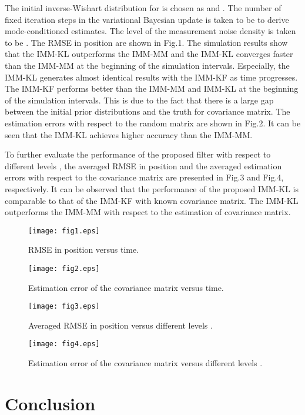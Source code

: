 \documentclass[12pt,draftcls,onecolumn]{IEEEtran}
\begin{document}
The initial inverse-Wishart distribution for  is chosen as
 and  .
The number of fixed iteration steps in the variational Bayesian
update is taken to be  to derive mode-conditioned estimates.
The level of the measurement noise density is taken to be .
The RMSE in position are shown in Fig.1. The simulation results show
that the IMM-KL outperforms the IMM-MM and the IMM-KL converges
faster than the IMM-MM at the beginning of the simulation intervals.
Especially, the IMM-KL generates almost identical results with the
IMM-KF as time progresses. The IMM-KF performs better than the
IMM-MM and IMM-KL at the beginning of the simulation intervals. This
is due to the fact that there is a large gap between the initial
prior distributions and the truth for covariance matrix. The
estimation errors with respect to the random matrix  are shown
in Fig.2. It can be seen that the IMM-KL achieves higher accuracy
than the IMM-MM.


To further evaluate the performance of the proposed filter with
respect to different levels , the averaged RMSE in position and
the averaged estimation errors with respect to the covariance matrix
are presented in Fig.3 and Fig.4, respectively. It can be observed
that the performance of the proposed IMM-KL is comparable to that of
the IMM-KF with known covariance matrix. The IMM-KL outperforms the
IMM-MM with respect to the estimation of covariance matrix.


\begin{figure}
\centering
\texttt{[image: fig1.eps]}
\caption{RMSE in position versus time.} \label{fig1}
\end{figure}
\begin{figure}
\centering
\texttt{[image: fig2.eps]}
\caption{Estimation error of the covariance matrix versus time.}
\label{fig2}
\end{figure}
\begin{figure}
\centering
\texttt{[image: fig3.eps]}
\caption{Averaged RMSE in position versus different levels .}
\label{fig3}
\end{figure}
\begin{figure}
\centering
\texttt{[image: fig4.eps]}
\caption{Estimation error of the covariance matrix versus different
levels .} \label{fig4}
\end{figure}

\section{Conclusion}
\end{document}
